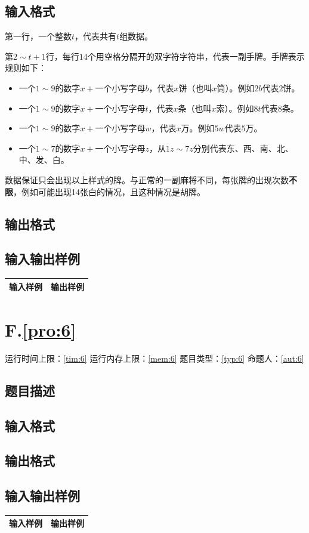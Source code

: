 \documentclass[
	lang=cn,
	color=green
]{elegantbook}
\begin{document}
\section*{输入格式}
第一行，一个整数$t$，代表共有$t$组数据。

第$2 \sim t+1$行，每行$14$个用空格分隔开的双字符字符串，代表一副手牌。手牌表示规则如下：

\begin{itemize}
	\item 一个$1 \sim 9$的数字$x+$一个小写字母$b$，代表$x$饼（也叫$x$筒）。例如$2b$代表$2$饼。
	\item 一个$1 \sim 9$的数字$x+$一个小写字母$t$，代表$x$条（也叫$x$索）。例如$8t$代表$8$条。
	\item 一个$1 \sim 9$的数字$x+$一个小写字母$w$，代表$x$万。例如$5w$代表$5$万。
	\item 一个$1 \sim 7$的数字$x+$一个小写字母$z$，从$1z \sim 7z$分别代表东、西、南、北、中、发、白。
\end{itemize}

数据保证只会出现以上样式的牌。与正常的一副麻将不同，每张牌的出现次数\textbf{不限}，例如可能出现14张白的情况，且这种情况是胡牌。

\section*{输出格式}

\section*{输入输出样例}
\begin{tabularx}{450pt}{X|X}
	\toprule
	输入样例 & 输出样例 \\
	\midrule

	\bottomrule
\end{tabularx}

\newpage
\chapter*{F.\quad \ref*{pro:6}}
\begin{center}
	运行时间上限：\ref*{tim:6} \quad 运行内存上限：\ref*{mem:6} \quad 题目类型：\ref*{typ:6} \quad 命题人：\ref*{aut:6}
\end{center}

\section*{题目描述}

\section*{输入格式}

\section*{输出格式}

\section*{输入输出样例}
\begin{tabularx}{450pt}{X|X}
	\toprule
	输入样例 & 输出样例 \\
	\midrule

	\bottomrule
\end{tabularx}
\end{document}
